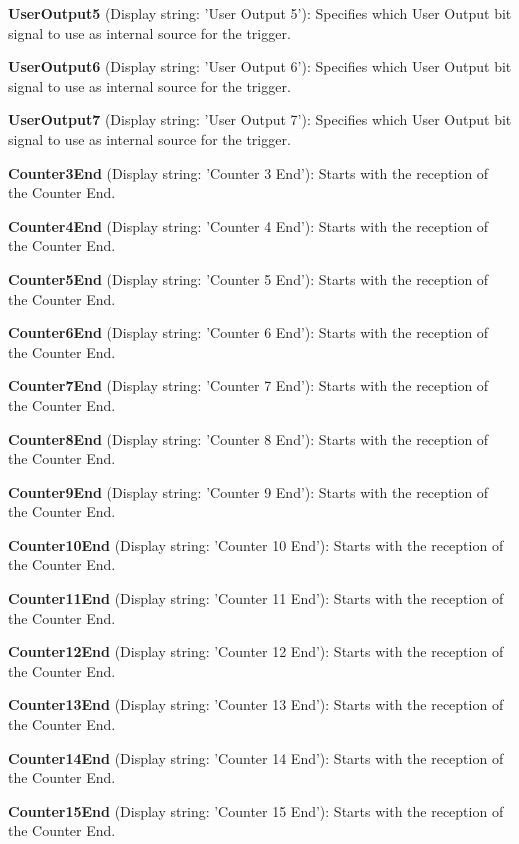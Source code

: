 \begin{DoxyItemize}
\item {\bfseries User\+Output5} (Display string\+: 'User Output 5')\+: Specifies which User Output bit signal to use as internal source for the trigger.
\item {\bfseries User\+Output6} (Display string\+: 'User Output 6')\+: Specifies which User Output bit signal to use as internal source for the trigger.
\item {\bfseries User\+Output7} (Display string\+: 'User Output 7')\+: Specifies which User Output bit signal to use as internal source for the trigger.
\item {\bfseries Counter3\+End} (Display string\+: 'Counter 3 End')\+: Starts with the reception of the Counter End.
\item {\bfseries Counter4\+End} (Display string\+: 'Counter 4 End')\+: Starts with the reception of the Counter End.
\item {\bfseries Counter5\+End} (Display string\+: 'Counter 5 End')\+: Starts with the reception of the Counter End.
\item {\bfseries Counter6\+End} (Display string\+: 'Counter 6 End')\+: Starts with the reception of the Counter End.
\item {\bfseries Counter7\+End} (Display string\+: 'Counter 7 End')\+: Starts with the reception of the Counter End.
\item {\bfseries Counter8\+End} (Display string\+: 'Counter 8 End')\+: Starts with the reception of the Counter End.
\item {\bfseries Counter9\+End} (Display string\+: 'Counter 9 End')\+: Starts with the reception of the Counter End.
\item {\bfseries Counter10\+End} (Display string\+: 'Counter 10 End')\+: Starts with the reception of the Counter End.
\item {\bfseries Counter11\+End} (Display string\+: 'Counter 11 End')\+: Starts with the reception of the Counter End.
\item {\bfseries Counter12\+End} (Display string\+: 'Counter 12 End')\+: Starts with the reception of the Counter End.
\item {\bfseries Counter13\+End} (Display string\+: 'Counter 13 End')\+: Starts with the reception of the Counter End.
\item {\bfseries Counter14\+End} (Display string\+: 'Counter 14 End')\+: Starts with the reception of the Counter End.
\item {\bfseries Counter15\+End} (Display string\+: 'Counter 15 End')\+: Starts with the reception of the Counter End.

\end{DoxyItemize}
